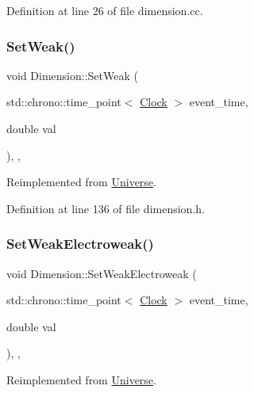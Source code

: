 Definition at line 26 of file dimension.\+cc.

\mbox{\label{class_dimension_a157cfa28dd6bc5518d622d01445ca827}} 
\subsubsection{\texorpdfstring{Set\+Weak()}{SetWeak()}}
{\footnotesize\ttfamily void Dimension\+::\+Set\+Weak (\begin{DoxyParamCaption}\item[{std\+::chrono\+::time\+\_\+point$<$ \hyperlink{universe_8h_a0ef8d951d1ca5ab3cfaf7ab4c7a6fd80}{Clock} $>$}]{event\+\_\+time,  }\item[{double}]{val }\end{DoxyParamCaption})\hspace{0.3cm}{\ttfamily [inline]}, {\ttfamily [final]}, {\ttfamily [virtual]}}



Reimplemented from \hyperlink{class_universe_a0f5cd04081b41ee931c0557dc397f6fb}{Universe}.



Definition at line 136 of file dimension.\+h.

\mbox{\label{class_dimension_a1d2accef9e6adf747f5cc143ae4527c9}} 
\subsubsection{\texorpdfstring{Set\+Weak\+Electroweak()}{SetWeakElectroweak()}}
{\footnotesize\ttfamily void Dimension\+::\+Set\+Weak\+Electroweak (\begin{DoxyParamCaption}\item[{std\+::chrono\+::time\+\_\+point$<$ \hyperlink{universe_8h_a0ef8d951d1ca5ab3cfaf7ab4c7a6fd80}{Clock} $>$}]{event\+\_\+time,  }\item[{double}]{val }\end{DoxyParamCaption})\hspace{0.3cm}{\ttfamily [inline]}, {\ttfamily [final]}, {\ttfamily [virtual]}}



Reimplemented from \hyperlink{class_universe_a2d3d642bfdc863248e93535832fa4b00}{Universe}.



